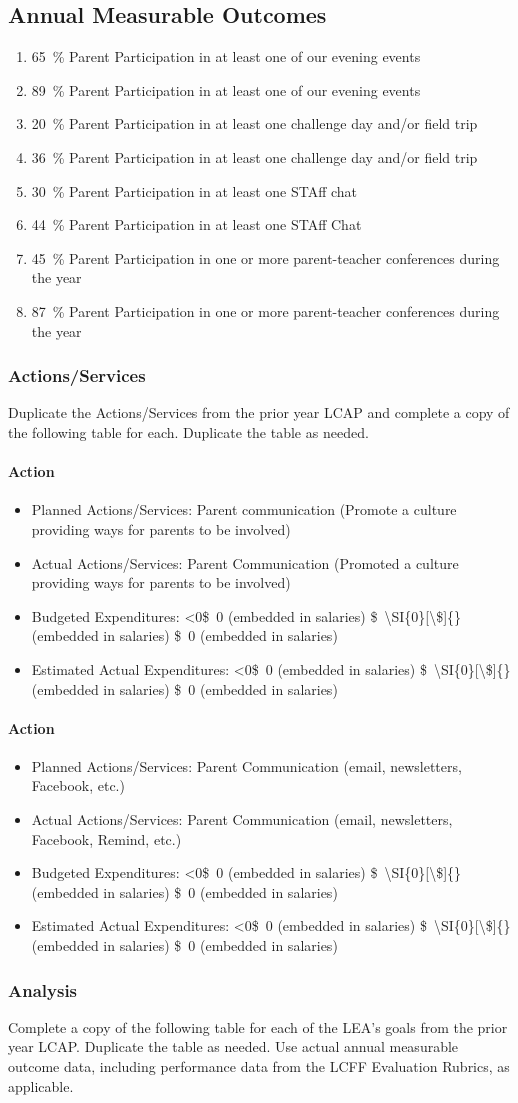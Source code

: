 \documentclass{article}
\makeatletter
\newcommand{\dollar}[1]{\SI{#1}[\$]{}}
\newcounter{goal}[section]
\newcommand*{\expact}[1]{%
	\expandafter\@expact\csname c@#1\endcsname%
}
\newcommand*{\@expact}[1]{%
	$\ifcase\intcalcSub{2}{\intcalcMod{#1}{2}}\or{\text{Expected:}}\or{\text{Actual:}}
    \else\@ctrerr\fi$
}
\newcommand{\outcomepair}[2]{
	\item #1
	\item #2
	\bigskip
}
\newenvironment{outcomes}
	{
		\subsection{Annual Measurable Outcomes}
		\begin{enumerate}[label=\expact*]
		\setlength{\itemsep}{0pt}
	}
	{\end{enumerate}}
\newcounter{action}[goal]
\newcommand{\actionupdate}[4]{
	\stepcounter{action}
	\paragraph{Action \theaction}
	\begin{itemize}[label={}]
		\item Planned Actions/Services: #1
		\item Actual Actions/Services: #2
		\item Budgeted Expenditures: 
			\ifnum0<0#3\relax
				\dollar{#3}
			\else
				#3
			\fi
		\item Estimated Actual Expenditures: 
			\ifnum0<0#4\relax
				\dollar{#4}
			\else
				#4
			\fi
	\end{itemize}
}
\makeatother
\begin{document}
\begin{outcomes}
	\outcomepair
	{\SI{65}{\percent} Parent Participation in at least one of our evening events}
	{\SI{89}{\percent} Parent Participation in at least one of our evening events}
	\outcomepair
	{\SI{20}{\percent} Parent Participation in at least one challenge day and/or field trip}
	{\SI{36}{\percent} Parent Participation in at least one challenge day and/or field trip}
	\outcomepair
	{\SI{30}{\percent} Parent Participation in at least one STAff chat}
	{\SI{44}{\percent} Parent Participation in at least one STAff Chat}
	\outcomepair
	{\SI{45}{\percent} Parent Participation in one or more parent-teacher conferences during the year}
	{\SI{87}{\percent} Parent Participation in one or more parent-teacher conferences during the year}
\end{outcomes}

\subsubsection{Actions/Services}
Duplicate the Actions/Services from the prior year LCAP and complete a copy of the following table for each. Duplicate the table as needed.
\actionupdate
	{Parent communication (Promote a culture providing ways for parents to be involved)}
	{Parent Communication (Promoted a culture providing ways for parents to be involved)}
	{\dollar{0} (embedded in salaries)}
	{\dollar{0} (embedded in salaries)}

\actionupdate
	{Parent Communication (email, newsletters, Facebook, etc.)}
	{Parent Communication (email, newsletters, Facebook, Remind, etc.)}
	{\dollar{0} (embedded in salaries)}
	{\dollar{0} (embedded in salaries)}

\subsubsection{Analysis}
Complete a copy of the following table for each of the LEA's goals from the prior year LCAP. Duplicate the table as needed. Use actual annual measurable outcome data, including performance data from the LCFF Evaluation Rubrics, as applicable.
\end{document}
